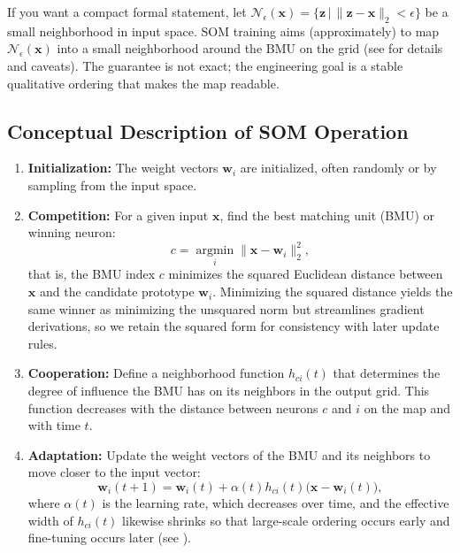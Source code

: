 If you want a compact formal statement, let \(\mathcal{N}_\epsilon(\mathbf{x})=\{\mathbf{z}\,|\,\|\mathbf{z}-\mathbf{x}\|_2<\epsilon\}\) be a small neighborhood in input space. SOM training aims (approximately) to map \(\mathcal{N}_\epsilon(\mathbf{x})\) into a small neighborhood around the BMU on the grid (see \citealp{Kohonen2001} for details and caveats). The guarantee is not exact; the engineering goal is a stable qualitative ordering that makes the map readable.

\subsection{Conceptual Description of SOM Operation}
\label{sec:som_conceptual_description_of_som_operation}

\begin{enumerate}
    \item \textbf{Initialization:} The weight vectors \(\mathbf{w}_i\) are initialized, often randomly or by sampling from the input space.

    \item \textbf{Competition:} For a given input \(\mathbf{x}\), find the best matching unit (BMU) or winning neuron:
    \begin{equation}
        c = \operatorname*{argmin}_{i} \|\mathbf{x} - \mathbf{w}_i\|_2^2, \label{eq:bmu}
    \end{equation}
    that is, the BMU index \(c\) minimizes the squared Euclidean distance between \(\mathbf{x}\) and the candidate prototype \(\mathbf{w}_i\).
    Minimizing the squared distance yields the same winner as minimizing the unsquared norm but streamlines gradient derivations, so we retain the squared form for consistency with later update rules.

    \item \textbf{Cooperation:} Define a neighborhood function \(h_{ci}(t)\) that determines the degree of influence the BMU has on its neighbors in the output grid. This function decreases with the distance between neurons \(c\) and \(i\) on the map and with time \(t\).

    \item \textbf{Adaptation:} Update the weight vectors of the BMU and its neighbors to move closer to the input vector:
    \begin{equation}
        \mathbf{w}_i(t+1) = \mathbf{w}_i(t) + \alpha(t) h_{ci}(t) \big(\mathbf{x} - \mathbf{w}_i(t)\big), \label{eq:som_update}
    \end{equation}
    where \(\alpha(t)\) is the learning rate, which decreases over time, and the effective width of \(h_{ci}(t)\) likewise shrinks so that large-scale ordering occurs early and fine-tuning occurs later (see ).
\end{enumerate}

